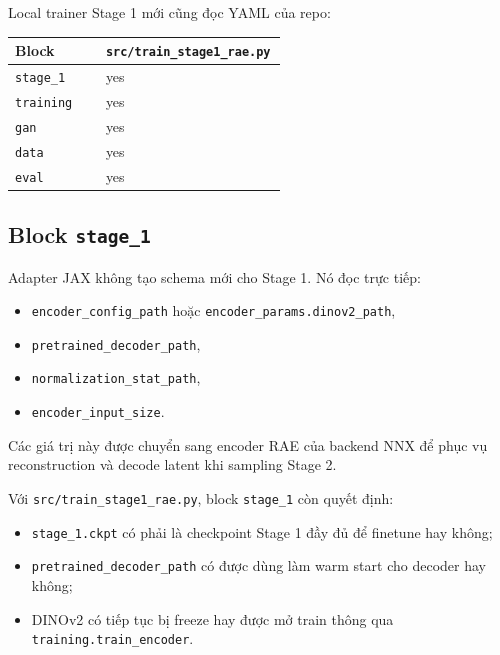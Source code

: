 Local trainer Stage 1 mới cũng đọc YAML của repo:

\begin{center}
\begin{tabular}{>{\raggedright\arraybackslash}p{0.32\linewidth} >{\centering\arraybackslash}p{0.22\linewidth}}
\toprule
Block & \texttt{src/train\_stage1\_rae.py} \\
\midrule
\texttt{stage\_1} & yes \\
\texttt{training} & yes \\
\texttt{gan} & yes \\
\texttt{data} & yes \\
\texttt{eval} & yes \\
\bottomrule
\end{tabular}
\end{center}

\subsection{Block \texttt{stage\_1}}

Adapter JAX không tạo schema mới cho Stage 1. Nó đọc trực tiếp:

\begin{itemize}[leftmargin=1.5em]
  \item \texttt{encoder\_config\_path} hoặc \texttt{encoder\_params.dinov2\_path},
  \item \texttt{pretrained\_decoder\_path},
  \item \texttt{normalization\_stat\_path},
  \item \texttt{encoder\_input\_size}.
\end{itemize}

Các giá trị này được chuyển sang encoder RAE của backend NNX để phục vụ
reconstruction và decode latent khi sampling Stage 2.

Với \texttt{src/train\_stage1\_rae.py}, block \texttt{stage\_1} còn quyết định:

\begin{itemize}[leftmargin=1.5em]
  \item \texttt{stage\_1.ckpt} có phải là checkpoint Stage 1 đầy đủ để finetune hay không;
  \item \texttt{pretrained\_decoder\_path} có được dùng làm warm start cho decoder hay không;
  \item DINOv2 có tiếp tục bị freeze hay được mở train thông qua
  \texttt{training.train\_encoder}.
\end{itemize}

